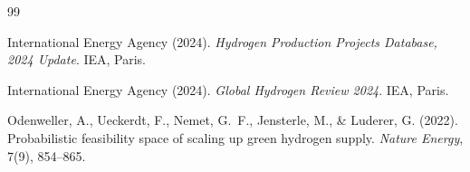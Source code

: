 \documentclass[11pt,a4paper]{article}
\begin{document}

\begin{thebibliography}{99}

International Energy Agency (2024).
\newblock \textit{Hydrogen Production Projects Database, 2024 Update}.
\newblock IEA, Paris.

International Energy Agency (2024).
\newblock \textit{Global Hydrogen Review 2024}.
\newblock IEA, Paris.

Odenweller, A., Ueckerdt, F., Nemet, G.~F., Jensterle, M., \& Luderer, G. (2022).
\newblock Probabilistic feasibility space of scaling up green hydrogen supply.
\newblock \textit{Nature Energy}, 7(9), 854--865.

\end{thebibliography}
\end{document}
